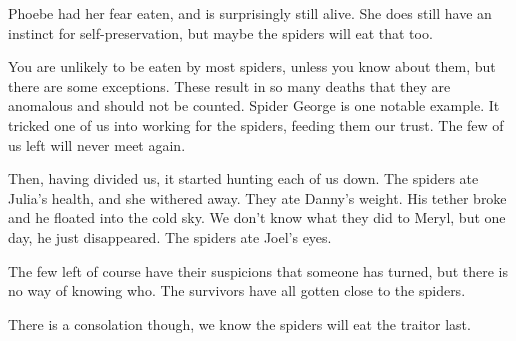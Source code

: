 Phoebe had her fear eaten, and is surprisingly still alive. She does still have an instinct for self-preservation, but maybe the spiders will eat that too.  

You are unlikely to be eaten by most spiders, unless you know about them, but there are some exceptions. These result in so many deaths that they are anomalous and should not be counted. Spider George is one notable example. It tricked one of us into working for the spiders, feeding them our trust. The few of us left will never meet again.  

Then, having divided us, it started hunting each of us down. The spiders ate Julia’s health, and she withered away. They ate Danny’s weight. His tether broke and he floated into the cold sky. We don’t know what they did to Meryl, but one day, he just disappeared. The spiders ate Joel’s eyes. 

The few left of course have their suspicions that someone has turned, but there is no way of knowing who. The survivors have all gotten close to the spiders. 

There is a consolation though, we know the spiders will eat the traitor last. 